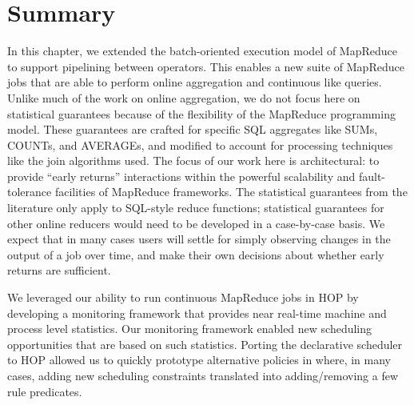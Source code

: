 \section{Summary}

In this chapter, we extended the batch-oriented execution model of MapReduce to
support pipelining between operators.  This enables a new suite of MapReduce
jobs that are able to perform online aggregation and continuous like queries.
Unlike much of the work on online aggregation, we do not focus here on
statistical guarantees because of the flexibility of the MapReduce programming
model.  These guarantees are crafted for specific SQL aggregates like SUMs,
COUNTs, and AVERAGEs, and modified to account for processing techniques like
the join algorithms used.  The focus of our work here is architectural: to
provide ``early returns'' interactions within the powerful scalability and
fault-tolerance facilities of MapReduce frameworks.  The statistical guarantees
from the literature only apply to SQL-style reduce functions; statistical
guarantees for other online reducers would need to be developed in a
case-by-case basis.  We expect that in many cases users will settle for simply
observing changes in the output of a job over time, and make their own
decisions about whether early returns are sufficient.

We leveraged our ability to run continuous MapReduce jobs in HOP by developing
a monitoring framework that provides near real-time machine and process level
statistics.  Our monitoring framework enabled new scheduling opportunities that
are based on such statistics.  Porting the declarative scheduler to HOP allowed
us to quickly prototype alternative policies in \OVERLOG where, in many cases,
adding new scheduling constraints translated into adding/removing a few rule
predicates.



